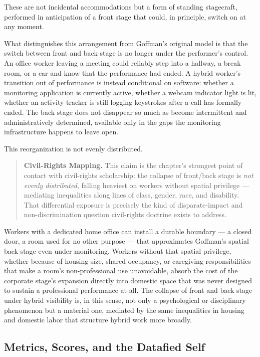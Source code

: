 \documentclass[12pt, a4paper]{article}
\begin{document}
These are not incidental accommodations but a form of standing stagecraft, performed in anticipation of a front stage that could, in principle, switch on at any moment.

What distinguishes this arrangement from Goffman's original model is that the switch between front and back stage is no longer under the performer's control. An office worker leaving a meeting could reliably step into a hallway, a break room, or a car and know that the performance had ended. A hybrid worker's transition out of performance is instead conditional on software: whether a monitoring application is currently active, whether a webcam indicator light is lit, whether an activity tracker is still logging keystrokes after a call has formally ended. The back stage does not disappear so much as become intermittent and administratively determined, available only in the gaps the monitoring infrastructure happens to leave open.

This reorganization is not evenly distributed.

\begin{quote}
\textbf{Civil-Rights Mapping.} This claim is the chapter's strongest point of contact with civil-rights scholarship: the collapse of front/back stage is \textit{not evenly distributed}, falling heaviest on workers without spatial privilege --- mediating inequalities along lines of class, gender, race, and disability. That differential exposure is precisely the kind of disparate-impact and non-discrimination question civil-rights doctrine exists to address.
\end{quote}

Workers with a dedicated home office can install a durable boundary --- a closed door, a room used for no other purpose --- that approximates Goffman's spatial back stage even under monitoring. Workers without that spatial privilege, whether because of housing size, shared occupancy, or caregiving responsibilities that make a room's non-professional use unavoidable, absorb the cost of the corporate stage's expansion directly into domestic space that was never designed to sustain a professional performance at all. The collapse of front and back stage under hybrid visibility is, in this sense, not only a psychological or disciplinary phenomenon but a material one, mediated by the same inequalities in housing and domestic labor that structure hybrid work more broadly.

\subsection{Metrics, Scores, and the Datafied Self}
\end{document}
